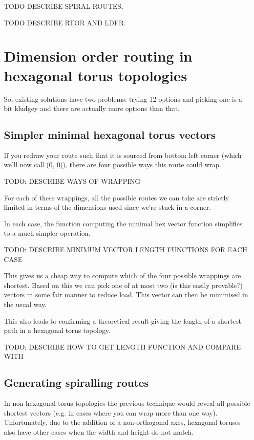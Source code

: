 			TODO DESCRIBE SPIRAL ROUTES.
			
			TODO DESCRIBE RTOR AND LDFR.
		
	\section{Dimension order routing in hexagonal torus topologies}
		
		So, existing solutions have two problems: trying 12 options and picking one
		is a bit kludgey and there are actually more options than that.
		
		\subsection{Simpler minimal hexagonal torus vectors}
			
			If you redraw your route such that it is sourced from bottom left corner
			(which we'll now call (0, 0)), there are four possible ways this route
			could wrap.
			
			TODO: DESCRIBE WAYS OF WRAPPING
			
			For each of these wrappings, all the possible routes we can take are
			strictly limited in terms of the dimensions used since we're stuck in a
			corner.
			
			In each case, the function computing the minimal hex vector function
			simplifies to a much simpler operation.
			
			TODO: DESCRIBE MINIMUM VECTOR LENGTH FUNCTIONS FOR EACH CASE
			
			This gives us a cheap way to compute which of the four possible wrappings
			are shortest. Based on this we can pick one of at most two (is this
			easily provable?) vectors in some fair manner to reduce load. This vector
			can then be minimised in the usual way.
			
			This also leads to confirming a theoretical result giving the length of a
			shortest path in a hexagonal torus topology.
			
			TODO: DESCRIBE HOW TO GET LENGTH FUNCTION AND COMPARE WITH \cite{xiao04}
		
		\subsection{Generating spiralling routes}
			
			In non-hexagonal torus topologies the previous technique would reveal all
			possible shortest vectors (e.g. in cases where you can wrap more than one
			way). Unfortunately, due to the addition of a non-orthogonal axes,
			hexagonal toruses also have other cases when the width and height do not
			match.
			
